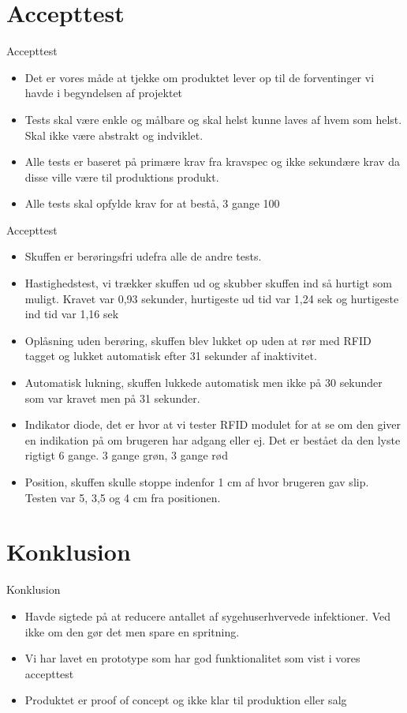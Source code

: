 \documentclass{beamer}
\begin{document}

\section{Accepttest}
\begin{frame}{Accepttest}
\begin{itemize}
\item Det er vores måde at tjekke om produktet lever op til de forventinger vi havde i begyndelsen af projektet
\item Tests skal være enkle og målbare og skal helst kunne laves af hvem som helst. Skal ikke være abstrakt og indviklet.
\item Alle tests er baseret på primære krav fra kravspec og ikke sekundære krav da disse ville være til produktions produkt.
\item Alle tests skal opfylde krav for at bestå, 3 gange 100%
\end{itemize}
\end{frame}

\begin{frame}{Accepttest}
\begin{itemize}
\item Skuffen er berøringsfri udefra alle de andre tests.
\item Hastighedstest, vi trækker skuffen ud og skubber skuffen ind så hurtigt som muligt. Kravet var 0,93 sekunder, hurtigeste ud tid var 1,24 sek og hurtigeste ind tid var 1,16 sek
\item Oplåsning uden berøring, skuffen blev lukket op uden at rør med RFID tagget og lukket automatisk efter 31 sekunder af inaktivitet.
\item Automatisk lukning, skuffen lukkede automatisk men ikke på 30 sekunder som var kravet men på 31 sekunder.
\item Indikator diode, det er hvor at vi tester RFID modulet for at se om den giver en indikation på om brugeren har adgang eller ej.  Det er bestået da den lyste rigtigt 6 gange.  3 gange grøn, 3 gange rød
\item Position, skuffen skulle stoppe indenfor 1 cm af hvor brugeren gav slip.  Testen var 5, 3,5 og 4 cm fra positionen.
\end{itemize}
\end{frame}

\section{Konklusion}
\begin{frame}{Konklusion}
\begin{itemize}
\item Havde sigtede på at reducere antallet af sygehuserhvervede infektioner.  Ved ikke om den gør det men spare en spritning.
\item Vi har lavet en prototype som har god funktionalitet som vist i vores accepttest
\item Produktet er proof of concept og ikke klar til produktion eller salg
\end{itemize}
\end{frame}
\end{document}

